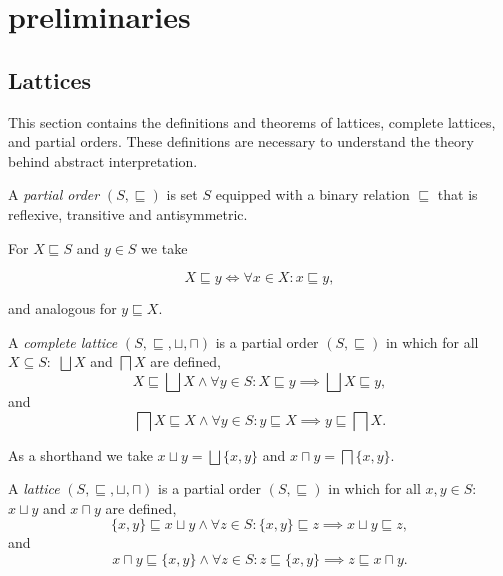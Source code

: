
\section{preliminaries}\label{sec:preliminaries}

\subsection{Lattices}\label{subsec:lattices}
This section contains the definitions and theorems of lattices, complete lattices, and partial orders.
These definitions are necessary to understand the theory behind abstract interpretation.\cite{nielson_formal_2019}


\begin{definition}
    A \textit{partial order} $(S, \sqsubseteq)$ is set $S$ equipped with a binary relation $\sqsubseteq$ that is reflexive, transitive and antisymmetric.
\end{definition}


For $X \sqsubseteq S$ and $y \in S$ we take


\begin{equation*}
    X \sqsubseteq y \iff \forall x \in X : x \sqsubseteq y,
\end{equation*}


and analogous for $y \sqsubseteq X$.


\begin{definition}
    A \textit{complete lattice} $(S, \sqsubseteq, \sqcup, \sqcap)$ is a partial order $(S, \sqsubseteq)$ in which for all $X \subseteq S:$ $\bigsqcup X$ and $\bigsqcap X$ are defined,
        \begin{equation*}
            X \sqsubseteq \bigsqcup X \land \forall y \in S : X \sqsubseteq y \implies \bigsqcup X \sqsubseteq y,
        \end{equation*}
        and
        \begin{equation*}
            \bigsqcap X \sqsubseteq X \land \forall y \in S : y \sqsubseteq X \implies y \sqsubseteq \bigsqcap X.
        \end{equation*}
\end{definition}


As a shorthand we take $x \sqcup y = \bigsqcup \{x, y\}$ and $x \sqcap y = \bigsqcap \{x, y\}$.


\begin{definition}
    A \textit{lattice} $(S, \sqsubseteq, \sqcup, \sqcap)$ is a partial order $(S, \sqsubseteq)$ in which for all $x,y \in S:$ $x \sqcup y$ and $x \sqcap y$ are defined,
        \begin{equation*}
            \{x, y\} \sqsubseteq x \sqcup y \land \forall z \in S : \{x, y\} \sqsubseteq z \implies x \sqcup y \sqsubseteq z,
        \end{equation*}
        and
        \begin{equation*}
            x \sqcap y \sqsubseteq \{x, y\} \land \forall z \in S : z \sqsubseteq \{x, y\} \implies z \sqsubseteq x \sqcap y.
        \end{equation*}
\end{definition}


